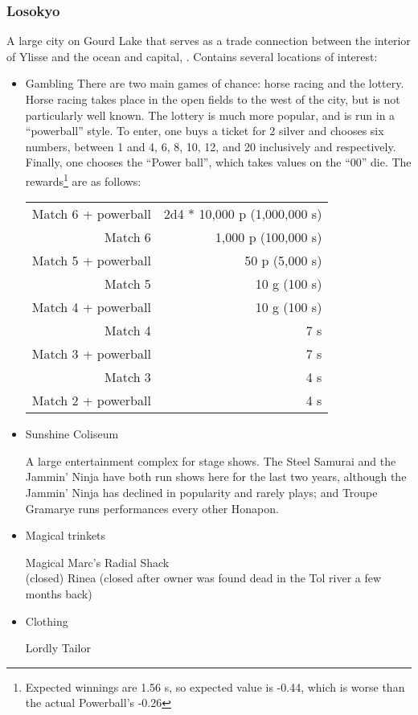 \subsubsection{Losokyo}
\label{places:losokyo}
A large city on Gourd Lake that serves as a trade connection between the interior of Ylisse and the ocean and capital, . Contains several locations of interest:
\begin{itemize}
\item Gambling
There are two main games of chance: horse racing and the lottery. Horse racing takes place in the open fields to the west of the city, but is not particularly well known. The lottery is much more popular, and is run in a ``powerball'' style. To enter, one buys a ticket for 2 silver and chooses six numbers, between 1 and 4, 6, 8, 10, 12, and 20 inclusively and respectively. Finally, one chooses the ``Power ball'', which takes values on the ``00'' die. The rewards\footnote{Expected winnings are 1.56 s, so expected value is -0.44, which is worse than the actual Powerball's -0.26} are as follows:
\begin{tabular}{r r}
Match 6 + powerball & 2d4 * 10,000 p (1,000,000 s) \\
Match 6 & 1,000 p (100,000 s) \\
Match 5 + powerball & 50 p (5,000 s) \\
Match 5 & 10 g (100 s) \\
Match 4 + powerball & 10 g (100 s) \\
Match 4 & 7 s \\
Match 3 + powerball & 7 s\\
Match 3 & 4 s \\
Match 2 + powerball & 4 s\end{tabular}

\item Sunshine Coliseum

A large entertainment complex for stage shows. The Steel Samurai and the Jammin' Ninja have both run shows here for the last two years, although the Jammin' Ninja has declined in popularity and rarely plays; and Troupe Gramarye runs performances every other Honapon.

\item Magical trinkets

Magical Marc's Radial Shack \\
(closed) Rinea (closed after owner was found dead in the Tol river a few months back) \\

\item Clothing

Lordly Tailor


\end{itemize}


